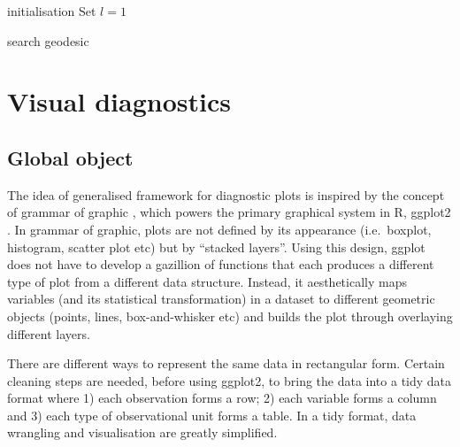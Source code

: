 \documentclass[12pt]{article}
\begin{document}
\begin{algorithm}
\SetAlgoLined
{}
  initialisation\;
  Set $l = 1$\;
  \caption{search geodesic}
  \label{search-geodesic}
\end{algorithm}

\newpage

\hypertarget{vis-diag}{%
\section{Visual diagnostics}\label{vis-diag}}

\hypertarget{global-object}{%
\subsection{Global object}\label{global-object}}

The idea of generalised framework for diagnostic plots is inspired by
the concept of grammar of graphic \citep{wickham2010layered}, which
powers the primary graphical system in R, ggplot2 \citep{ggplot2}. In
grammar of graphic, plots are not defined by its appearance
(i.e.~boxplot, histogram, scatter plot etc) but by ``stacked layers''.
Using this design, ggplot does not have to develop a gazillion of
functions that each produces a different type of plot from a different
data structure. Instead, it aesthetically maps variables (and its
statistical transformation) in a dataset to different geometric objects
(points, lines, box-and-whisker etc) and builds the plot through
overlaying different layers.

There are different ways to represent the same data in rectangular form.
Certain cleaning steps are needed, before using ggplot2, to bring the
data into a tidy data format \citep{wickham2014tidy} where 1) each
observation forms a row; 2) each variable forms a column and 3) each
type of observational unit forms a table. In a tidy format, data
wrangling and visualisation are greatly simplified.
\end{document}
